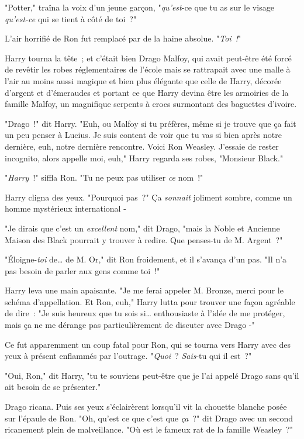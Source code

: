"Potter," traîna la voix d'un jeune garçon, "\emph{qu'est}-ce que tu as sur le visage \emph{qu'est-ce} qui se tient à côté de toi~?"

L'air horrifié de Ron fut remplacé par de la haine absolue. "\emph{Toi~!}"

Harry tourna la tête~; et c'était bien Drago Malfoy, qui avait peut-être été forcé de revêtir les robes réglementaires de l'école mais se rattrapait avec une malle à l'air au moins aussi magique et bien plus élégante que celle de Harry, décorée d'argent et d'émeraudes et portant ce que Harry devina être les armoiries de la famille Malfoy, un magnifique serpents à crocs surmontant des baguettes d'ivoire.

"Drago~!" dit Harry. "Euh, ou Malfoy si tu préfères, même si je trouve que ça fait un peu penser à Lucius. Je suis content de voir que tu vas si bien après notre dernière, euh, notre dernière rencontre. Voici Ron Weasley. J'essaie de rester incognito, alors appelle moi, euh," Harry regarda ses robes, "Monsieur Black."

"\emph{Harry}~!" siffla Ron. "Tu ne peux pas utiliser \emph{ce} nom~!"

Harry cligna des yeux. "Pourquoi pas~?" Ça \emph{sonnait} joliment sombre, comme un homme mystérieux international -

"Je dirais que c'est un \emph{excellent} nom," dit Drago, "mais la Noble et Ancienne Maison des Black pourrait y trouver à redire. Que penses-tu de M. Argent~?"

"Éloigne-\emph{toi} de… de M. Or," dit Ron froidement, et il s'avança d'un pas. "Il n'a pas besoin de parler aux gens comme toi~!"

Harry leva une main apaisante. "Je me ferai appeler M. Bronze, merci pour le schéma d'appellation. Et Ron, euh," Harry lutta pour trouver une façon agréable de dire~: "Je suis heureux que tu sois si… enthousiaste à l'idée de me protéger, mais ça ne me dérange pas particulièrement de discuter avec Drago -"

Ce fut apparemment un coup fatal pour Ron, qui se tourna vers Harry avec des yeux à présent enflammés par l'outrage. "\emph{Quoi}~? \emph{Sais}-tu qui il est~?"

"Oui, Ron," dit Harry, "tu te souviens peut-être que je l'ai appelé Drago sans qu'il ait besoin de se présenter."

Drago ricana. Puis ses yeux s'éclairèrent lorsqu'il vit la chouette blanche posée sur l'épaule de Ron. "Oh, qu'est ce que c'est que \emph{ça}~?" dit Drago avec un second ricanement plein de malveillance. "Où est le fameux rat de la famille Weasley~?"

